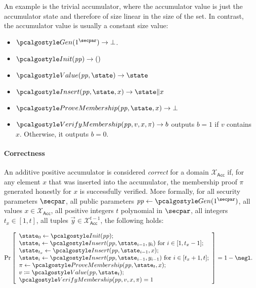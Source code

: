 \begin{example}
  An example is the trivial accumulator\label{sec:trivial-acc}, where the accumulator value is just the accumulator state and therefore of size linear in the size of the set. In contrast, the accumulator value is usually a constant size value:
  \begin{itemize}
    \item $\algo{Gen}(1^\secpar)\rightarrow \bot$.
    \item $\algo{Init}(\params)\rightarrow ()$
    \item $\algo{Value}(\params, \state)\rightarrow \state$
    \item $\algo{Insert}(\params, \state, x) \rightarrow \state \| x$
    \item $\algo{ProveMembership}(\params, \state, x) \rightarrow \bot$
    \item $\algo{VerifyMembership}(\params, v, x, \pi) \rightarrow b$ outputs $b = 1$ if $v$ contains $x$. Otherwise, it outputs $b = 0$.
  \end{itemize}
\end{example}

\paragraph{Correctness}

\begin{definition}[Correctness]
An additive positive accumulator is considered \emph{correct} for a domain $\mathcal{X}_\mathsf{Acc}$ if, for any element $x$ that was inserted into the accumulator, the membership proof $\pi$ generated honestly for $x$ is successfully verified.
More formally, for all security parameters $\secpar$, all public parameters $\params \gets \algo{Gen}(1^\secpar)$, all values $x \in \mathcal{X}_\mathsf{Acc}$, all positive integers $t$ polynomial in $\secpar$, all integers $t_x \in [1, t]$, all tuples $\vec{y} \in \mathcal{X}_\mathsf{Acc}^{t- 1}$, the following holds:

\[
    \Pr\left[
    \begin{array}{l}
        \state_0 \gets \algo{Init}(\params); \\
        \state_i \gets \algo{Insert}(\params, \state_{i - 1}, y_i) \text{ for } i \in [1, t_x - 1]; \\
        \state_{t_x} \gets \algo{Insert}(\params, \state_{i - 1}, x); \\
        \state_i \gets \algo{Insert}(\params, \state_{i - 1}, y_{i - 1}) \text{ for } i \in [t_x + 1, t]; \\
        \pi \gets \algo{ProveMembership}(\params, \state_t, x); \\
        v \defeq \algo{Value}(\params, \state_t); \\
        \algo{VerifyMembership}(\params, v, x, \pi) = 1
    \end{array}
    \right] = 1 - \negl.
\]
\end{definition}

